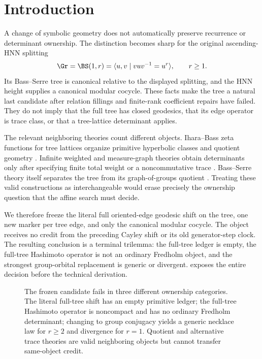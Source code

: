 \section{Introduction}
\label{sec:introduction}

A change of symbolic geometry does not automatically preserve recurrence or
determinant ownership.  The distinction becomes sharp for the original
ascending-HNN splitting
\begin{equation}
  \Gr=\BS(1,r)=\langle u,v\mid vuv^{-1}=u^r\rangle,
  \qquad r\ge1.
  \label{eq:presentation-intro}
\end{equation}
Its Bass--Serre tree is canonical relative to the displayed splitting, and
the HNN height supplies a canonical modular cocycle.  These facts make the
tree a natural last candidate after relation fillings and finite-rank
coefficient repairs have failed.  They do not imply that the full tree has
closed geodesics, that its edge operator is trace class, or that a
tree-lattice determinant applies.

The relevant neighboring theories count different objects.  Ihara--Bass
zeta functions for tree lattices organize primitive hyperbolic classes and
quotient geometry \citep{bass1992ihara,clair2001zeta}.  Infinite weighted and
measure-graph theories obtain determinants only after specifying finite total
weight or a noncommutative trace
\citep{deitmar2015ihara,lenz2019ihara}.  Bass--Serre theory itself separates
the tree from its graph-of-groups quotient \citep{serre1980trees}.  Treating
these valid constructions as interchangeable would erase precisely the
ownership question that the affine search must decide.

We therefore freeze the literal full oriented-edge geodesic shift on the
tree, one new marker per tree edge, and only the canonical modular cocycle.
The object receives no credit from the preceding Cayley shift or its old
generator-step clock.  The resulting conclusion is a terminal trilemma:
the full-tree ledger is empty, the full-tree Hashimoto operator is not an
ordinary Fredholm object, and the strongest group-orbital replacement is
generic or divergent.   exposes the entire
decision before the technical derivation.

\begin{figure}[t]
  \centering
  \resizebox{0.98\textwidth}{!}{}
  \caption{The frozen candidate fails in three different ownership
  categories.  The literal full-tree shift has an empty primitive ledger;
  the full-tree Hashimoto operator is noncompact and has no ordinary
  Fredholm determinant; changing to group conjugacy yields a generic
  necklace law for $r\ge2$ and divergence for $r=1$.  Quotient and alternative
  trace theories are valid neighboring objects but cannot transfer
  same-object credit.}
  \label{fig:tree-orbit-trilemma}
\end{figure}

